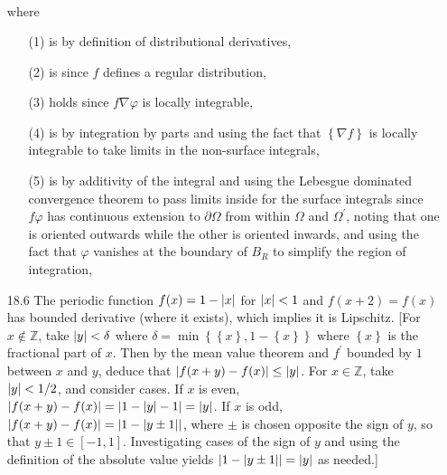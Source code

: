 \documentclass[11pt]{article}
\newcommand{\cbr}[1]{\left\{#1\right\}}
\begin{document}
\begin{enumerate}
\begin{align*}
    \end{align*} where \begin{enumerate}
        \item[(1)] is by definition of distributional derivatives,
        \item[(2)] is since $f$ defines a regular distribution,
        \item[(3)] holds since $f\nabla\varphi$ is locally integrable,
        \item[(4)] is by integration by parts and using the fact that $\cbr{\nabla f}$ is locally integrable to take limits in the non-surface integrals,
        \item[(5)] is by additivity of the integral and using the Lebesgue dominated convergence theorem to pass limits inside for the surface integrals since $f\varphi$ has continuous extension to $\partial\Omega$ from within $\Omega$ and $\Omega^\prime$, noting that one is oriented outwards while the other is oriented inwards, and using the fact that $\varphi$ vanishes at the boundary of $B_R$ to simplify the region of integration,
    \end{enumerate}


    \hrulefill

    \item[18.6] The periodic function $f(x) = 1-\abs{x}$ for $\abs{x}<1$ and $f(x+2)=f(x)$ has bounded derivative (where it exists), which implies it is Lipschitz. [For $x\not\in\mathbb{Z}$, take $\abs{y}<\delta$ where $\delta = \min\cbr{\cbr{x},1-\cbr{x}}$ where $\cbr{x}$ is the fractional part of $x$. Then by the mean value theorem and $f^\prime$ bounded by $1$ between $x$ and $y$, deduce that $\abs{f(x+y)-f(x)}\leq \abs{y}$. For $x\in\mathbb{Z}$, take $\abs{y}<1/2$, and consider cases. If $x$ is even, $\abs{f(x+y)-f(x)} = \abs{1-\abs{y}-1} = \abs{y}$. If $x$ is odd, $\abs{f(x+y)-f(x)} = \abs{1-\abs{y\pm 1}}$, where $\pm$ is chosen opposite the sign of $y$, so that $y\pm 1\in [-1,1]$. Investigating cases of the sign of $y$ and using the definition of the absolute value yields $\abs{1-\abs{y\pm 1}} = \abs{y}$ as needed.]
    

\end{enumerate}
\end{document}
